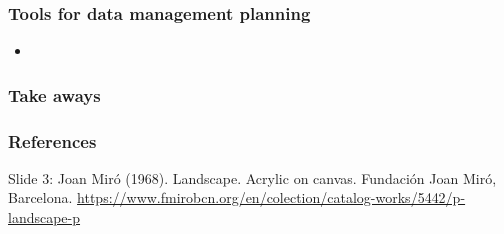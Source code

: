 \documentclass{beamer}
\begin{document}
\begin{frame}
  \frametitle{Tools for data management planning}
  
  \begin{itemize}
  \item 
  \end{itemize}
\end{frame}

\begin{frame}
  \frametitle{Take aways}
  
\end{frame}

\begin{frame}
  \frametitle{References}
  \tiny
  
  \vspace{0.5cm}
  Slide 3: Joan Mir{\'o} (1968). Landscape. Acrylic on canvas. Fundaci{\'o}n Joan Mir{\'o}, Barcelona. \url{https://www.fmirobcn.org/en/colection/catalog-works/5442/p-landscape-p}
\end{frame}
\end{document}
